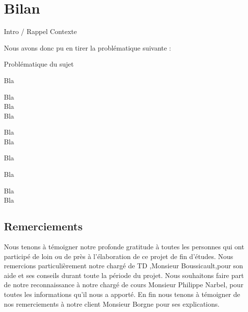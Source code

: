 \chapter{Bilan}

Intro / Rappel Contexte

Nous avons donc pu en tirer la problématique suivante :

\begin{center}
\hskip7mm
Problématique du sujet
\end{center}

Bla

Bla\\

Bla\\

Bla

Bla\\

Bla

Bla

\newpage

Bla

Bla\\

Bla

\newpage

\section{Remerciements}

Nous tenons à témoigner notre profonde gratitude à toutes les personnes qui ont participé de loin ou de près à l’élaboration de ce projet de fin d’études.
Nous remercions particulièrement notre chargé de TD ,Monsieur Boussicault,pour son aide et ses conseils durant toute la période du projet.
Nous souhaitons faire part de notre reconnaissance à notre chargé de cours Monsieur Philippe Narbel, pour toutes les informations qu'il nous a apporté.
En fin nous tenons à témoigner de nos remerciements à notre client Monsieur Borgne pour ses explications.
